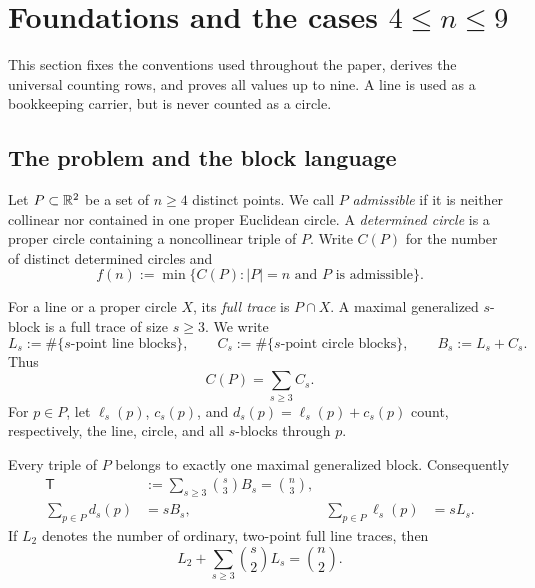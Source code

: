 \section{Foundations and the cases \texorpdfstring{$4\leq n\leq9$}{4 <= n <= 9}}
\label{sec:foundations-small}

This section fixes the conventions used throughout the paper, derives the
universal counting rows, and proves all values up to nine.  A line is used as
a bookkeeping carrier, but is never counted as a circle.

\subsection{The problem and the block language}

\begin{definition}\label{def:v1-admissible}
Let $P\subset\mathbb{R}^2$ be a set of $n\geq4$ distinct points.  We call $P$
\emph{admissible} if it is neither collinear nor contained in one proper
Euclidean circle.  A \emph{determined circle} is a proper circle containing a
noncollinear triple of $P$.  Write $C(P)$ for the number of distinct
determined circles and
\[
  f(n):=\min\{C(P): |P|=n\text{ and }P\text{ is admissible}\}.
\]
\end{definition}

For a line or a proper circle $X$, its \emph{full trace} is $P\cap X$.
A maximal generalized $s$-block is a full trace of size $s\geq3$.  We write
\[
 L_s:=\#\{\text{$s$-point line blocks}\},\qquad
 C_s:=\#\{\text{$s$-point circle blocks}\},\qquad
 B_s:=L_s+C_s.
\]
Thus
\begin{equation}\label{eq:circle-objective}
 C(P)=\sum_{s\geq3}C_s.
\end{equation}
For $p\in P$, let $\ell_s(p)$, $c_s(p)$, and
$d_s(p)=\ell_s(p)+c_s(p)$ count, respectively, the line, circle, and all
$s$-blocks through $p$.

\begin{lemma}\label{lem:triple-ownership}
Every triple of $P$ belongs to exactly one maximal generalized block.
Consequently
\begin{align}
 \mathsf T
   &:=\sum_{s\geq3}\binom{s}{3}B_s=\binom n3,
       \label{eq:row-T}\\
 \sum_{p\in P}d_s(p)&=sB_s,
 &\sum_{p\in P}\ell_s(p)&=sL_s.                  \label{eq:block-incidence}
\end{align}
If $L_2$ denotes the number of ordinary, two-point full line traces, then
\begin{equation}\label{eq:line-pair-partition}
 L_2+\sum_{s\geq3}\binom{s}{2}L_s=\binom n2.
\end{equation}
\end{lemma}

